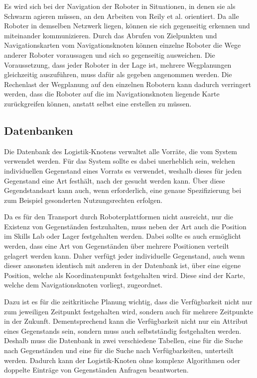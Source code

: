 Es wird sich bei der Navigation der Roboter in Situationen, in denen sie als Schwarm agieren müssen, an den Arbeiten von Reily et al. \cite{silentSwarm} orientiert. Da alle Roboter in demselben Netzwerk liegen, können sie sich gegenseitig erkennen und miteinander kommunizieren. Durch das Abrufen von Zielpunkten und Navigationskarten vom Navigationsknoten können einzelne Roboter die Wege anderer Roboter voraussagen und sich so gegenseitig ausweichen. Die Voraussetzung, dass jeder Roboter in der Lage ist, mehrere Wegplanungen gleichzeitig auszuführen, muss dafür als gegeben angenommen werden. Die Rechenlast der Wegplanung auf den einzelnen Robotern kann dadurch verringert werden, dass die Roboter auf die im Navigationsknoten liegende Karte zurückgreifen können, anstatt selbst eine erstellen zu müssen.



\FloatBarrier
\subsection{Datenbanken}

Die Datenbank des Logistik-Knotens verwaltet alle Vorräte, die vom System verwendet werden. Für das System sollte es dabei unerheblich sein, welchen individuellen Gegenstand eines Vorrats es verwendet, weshalb dieses für jeden Gegenstand eine Art festhält, nach der gesucht werden kann. Über diese Gegendstandsart kann auch, wenn erforderlich, eine genaue Spezifizierung bei zum Beispiel gesonderten Nutzungsrechten erfolgen.

Da es für den Transport durch Roboterplattformen nicht ausreicht, nur die Existenz von Gegenständen festzuhalten, muss neben der Art auch die Position im Skills Lab oder Lager festgehalten werden. Dabei sollte es auch ermöglicht werden, dass eine Art von Gegenständen über mehrere Positionen verteilt gelagert werden kann. Daher verfügt jeder individuelle Gegenstand, auch wenn dieser ansonsten identisch mit anderen in der Datenbank ist, über eine eigene Position, welche als Koordinatenpunkt festgehalten wird. Diese sind der Karte, welche dem Navigationsknoten vorliegt, zugeordnet.

Dazu ist es für die zeitkritische Planung wichtig, dass die Verfügbarkeit nicht nur zum jeweiligen Zeitpunkt festgehalten wird, sondern auch für mehrere Zeitpunkte in der Zukunft. Dementsprechend kann die Verfügbarkeit nicht nur ein Attribut eines Gegenstands sein, sondern muss auch selbstständig festgehalten werden. Deshalb muss die Datenbank in zwei verschiedene Tabellen, eine für die Suche nach Gegenständen und eine für die Suche nach Verfügbarkeiten, unterteilt werden. Dadurch kann der Logistik-Knoten ohne komplexe Algorithmen oder doppelte Einträge von Gegenständen Anfragen beantworten.

